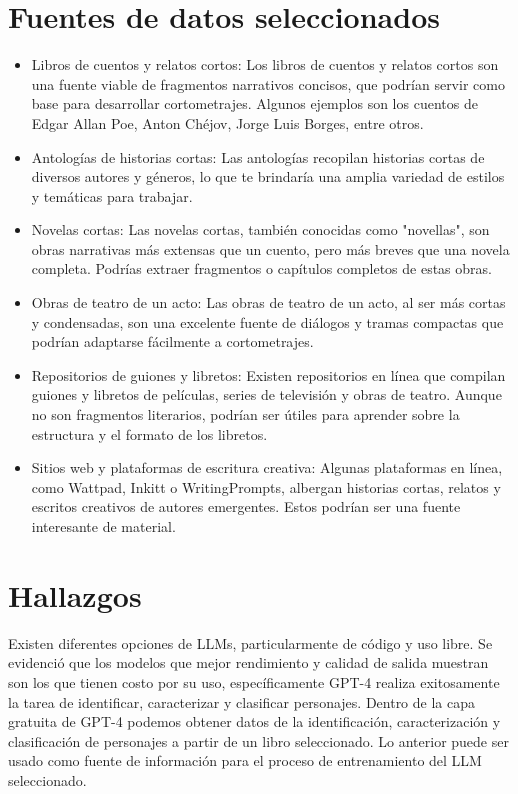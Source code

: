 \documentclass[journal,onecolumn]{IEEEtran}
\begin{document}
	\section{Fuentes de datos seleccionados}
	\begin{itemize}
		\item Libros de cuentos y relatos cortos: Los libros de cuentos y relatos cortos son una fuente viable de fragmentos narrativos concisos, que podrían servir como base para desarrollar cortometrajes. Algunos ejemplos son los cuentos de Edgar Allan Poe, Anton Chéjov, Jorge Luis Borges, entre otros.
		\item Antologías de historias cortas: Las antologías recopilan historias cortas de diversos autores y géneros, lo que te brindaría una amplia variedad de estilos y temáticas para trabajar.
		\item Novelas cortas: Las novelas cortas, también conocidas como "novellas", son obras narrativas más extensas que un cuento, pero más breves que una novela completa. Podrías extraer fragmentos o capítulos completos de estas obras.
		\item Obras de teatro de un acto: Las obras de teatro de un acto, al ser más cortas y condensadas, son una excelente fuente de diálogos y tramas compactas que podrían adaptarse fácilmente a cortometrajes.
		\item Repositorios de guiones y libretos: Existen repositorios en línea que compilan guiones y libretos de películas, series de televisión y obras de teatro. Aunque no son fragmentos literarios, podrían ser útiles para aprender sobre la estructura y el formato de los libretos.
		\item Sitios web y plataformas de escritura creativa: Algunas plataformas en línea, como Wattpad, Inkitt o WritingPrompts, albergan historias cortas, relatos y escritos creativos de autores emergentes. Estos podrían ser una fuente interesante de material.
	\end{itemize}
	\section{Hallazgos}
	Existen diferentes opciones de LLMs, particularmente de código y uso libre. Se evidenció que los modelos que mejor rendimiento y calidad de salida muestran son los que tienen costo por su uso, específicamente GPT-4 realiza exitosamente la tarea de identificar, caracterizar y clasificar personajes.
	Dentro de la capa gratuita de GPT-4 podemos obtener datos de la identificación, caracterización y clasificación de personajes a partir de un libro seleccionado. Lo anterior puede ser usado como fuente de información para el proceso de entrenamiento del LLM seleccionado.
\end{document}
